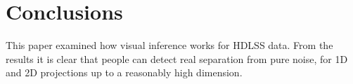%
% 
%
%


\section{Conclusions}

This paper examined how visual inference works for HDLSS data. From the results it is clear that people can detect real separation from pure noise, for 1D and 2D projections up to a reasonably high dimension.

